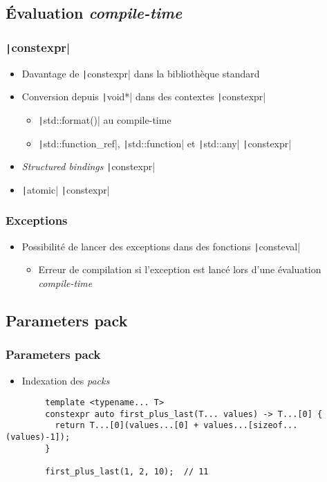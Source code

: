 \documentclass[C++.tex]{subfiles}
\begin{document}
\subsection*{Évaluation \textit{compile-time}}
\begin{frame}[fragile]
	\frametitle{\texttt|constexpr|}
	\begin{itemize}
		\item Davantage de \texttt|constexpr| dans la bibliothèque standard
		\item Conversion depuis \texttt|void*| dans des contextes \texttt|constexpr|
		\begin{itemize}
			\item \texttt|std::format()| au compile-time
			\item \texttt|std::function_ref|, \texttt|std::function| et \texttt|std::any| \texttt|constexpr|
		\end{itemize}
		\item \textit{Structured bindings} \texttt|constexpr|
		\item \texttt|atomic| \texttt|constexpr|
	\end{itemize}

\end{frame}

\begin{frame}[fragile]
	\frametitle{Exceptions}
	\begin{itemize}
		\item Possibilité de lancer des exceptions dans des fonctions \texttt|consteval|
		\begin{itemize}
			\item Erreur de compilation si l'exception est lancé lors d'une évaluation \textit{compile-time}
		\end{itemize}
	\end{itemize}

\end{frame}

\subsection*{Parameters pack}
\begin{frame}[fragile]
	\frametitle{Parameters pack}
	\begin{itemize}
		\item Indexation des \textit{packs}
	\end{itemize}

	\begin{verbatim}
		template <typename... T>
		constexpr auto first_plus_last(T... values) -> T...[0] {
		  return T...[0](values...[0] + values...[sizeof...(values)-1]);
		}

		first_plus_last(1, 2, 10);  // 11
	\end{verbatim}

\end{frame}
\end{document}
